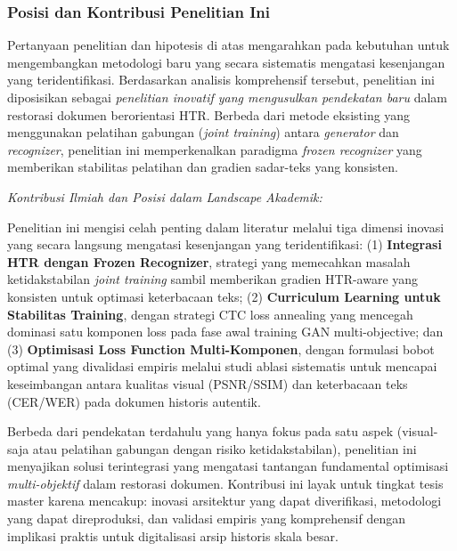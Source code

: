 \subsubsection{Posisi dan Kontribusi Penelitian Ini}
\label{subsubsec:research-positioning}

\vspace{1.5ex}

Pertanyaan penelitian dan hipotesis di atas mengarahkan pada kebutuhan untuk mengembangkan metodologi baru yang secara sistematis mengatasi kesenjangan yang teridentifikasi. Berdasarkan analisis komprehensif tersebut, penelitian ini diposisikan sebagai \textit{penelitian inovatif yang mengusulkan pendekatan baru} dalam restorasi dokumen berorientasi HTR. Berbeda dari metode eksisting yang menggunakan pelatihan gabungan (\textit{joint training}) antara \textit{generator} dan \textit{recognizer}, penelitian ini memperkenalkan paradigma \textit{frozen recognizer} yang memberikan stabilitas pelatihan dan gradien sadar-teks yang konsisten.

\vspace{0.5ex}
\textit{Kontribusi Ilmiah dan Posisi dalam Landscape Akademik:}

\vspace{0.3em}
Penelitian ini mengisi celah penting dalam literatur melalui tiga dimensi inovasi yang secara langsung mengatasi kesenjangan yang teridentifikasi: (1) \textbf{Integrasi HTR dengan Frozen Recognizer}, strategi yang memecahkan masalah ketidakstabilan \textit{joint training} sambil memberikan gradien HTR-aware yang konsisten untuk optimasi keterbacaan teks; (2) \textbf{Curriculum Learning untuk Stabilitas Training}, dengan strategi CTC loss annealing yang mencegah dominasi satu komponen loss pada fase awal training GAN multi-objective; dan (3) \textbf{Optimisasi Loss Function Multi-Komponen}, dengan formulasi bobot optimal yang divalidasi empiris melalui studi ablasi sistematis untuk mencapai keseimbangan antara kualitas visual (PSNR/SSIM) dan keterbacaan teks (CER/WER) pada dokumen historis autentik.

\vspace{0.3em}
Berbeda dari pendekatan terdahulu yang hanya fokus pada satu aspek (visual-saja atau pelatihan gabungan dengan risiko ketidakstabilan), penelitian ini menyajikan solusi terintegrasi yang mengatasi tantangan fundamental optimisasi \textit{multi-objektif} dalam restorasi dokumen. Kontribusi ini layak untuk tingkat tesis master karena mencakup: inovasi arsitektur yang dapat diverifikasi, metodologi yang dapat direproduksi, dan validasi empiris yang komprehensif dengan implikasi praktis untuk digitalisasi arsip historis skala besar.

